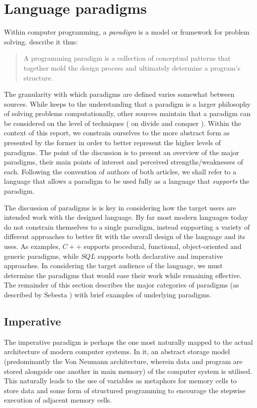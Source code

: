 \section{Language paradigms}
Within computer programming, a \emph{paradigm} is a model or framework for problem solving. \citeauthor{paradigms1992} describe it thus:

\begin{quote}
A programming paradigm is a collection of conceptual patterns that together mold the design process and ultimately determine a program's structure.
\end{quote}

The granularity with which paradigms are defined varies somewhat between sources. While \citeauthor{paradigms1992} keeps to the understanding that a paradigm is a larger philosophy of solving problems computationally, other sources maintain that a paradigm can be considered on the level of techniques (\citeauthor{paradigms1978} on divide and conquer \cite{paradigms1978}). Within the context of this report, we constrain ourselves to the more abstract form as presented by the former in order to better represent the higher levels of paradigms. The point of the discussion is to present an overview of the major paradigms, their main points of interest and perceived strengths/weaknesses of each. Following the convention of authors of both articles, we shall refer to a language that allows a paradigm to be used fully as a language that \emph{supports} the paradigm.

The discussion of paradigms is is key in considering how the target users are intended work with the designed language. By far most modern languages today do not constrain themselves to a single paradigm, instead supporting a variety of different approaches to better fit with the overall design of the language and its uses. As examples, $C++$ supports procedural, functional, object-oriented and generic paradigms, while $SQL$ supports both declarative and imperative approaches. In considering the target audience of the language, we must determine the paradigms that would ease their work while remaining effective. The remainder of this section describes the major categories of paradigms (as described by Sebesta ) with brief examples of underlying paradigms.

\subsection{Imperative}
The imperative paradigm is perhaps the one most naturally mapped to the actual architecture of modern computer systems. In it, an abstract storage model (predominantly the Von Neumann architecture, wherein data and program are stored alongside one another in main memory) of the computer system is utilised. This naturally leads to the use of variables as metaphors for memory cells to store data and some form of structured programming to encourage the stepwise execution of adjacent memory cells.


